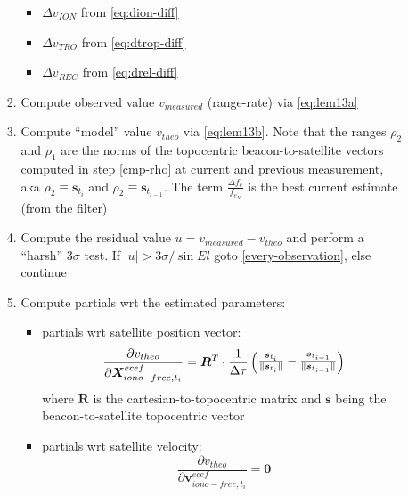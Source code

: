 \begin{enumerate}
\begin{enumerate}
\begin{enumerate}
              \begin{itemize}
                \item $\Delta v_{ION}$ from \ref{eq:dion-diff}
                \item $\Delta v_{TRO}$ from \ref{eq:dtrop-diff}
                \item $\Delta v_{REC}$ from \ref{eq:drel-diff}
              \end{itemize}
            \item Compute observed value $v_{measured}$ (range-rate) via \ref{eq:lem13a}
            \item Compute ``model'' value $v_{theo}$ via \ref{eq:lem13b}. Note that the ranges $\rho _2$ and 
              $\rho _1$ are the norms of the topocentric beacon-to-satellite vectors computed in 
              step \ref{cmp-rho} at current and previous measurement, aka $\rho _2 \equiv \bm{s}_{t_i}$ 
              and $\rho _2 \equiv \bm{s}_{t_{i-1}}$. The term $\frac{\Delta f_e}{f_{e_N}}$ is the 
              best current estimate (from the filter)
            \item Compute the residual value $u = v_{measured} - v_{theo}$ and 
              perform a ``harsh'' $3\sigma$ test. If $ |u| > 3 \sigma / \sin{El}$ 
              goto \ref{every-observation}, else continue
            \item Compute partials wrt the estimated parameters:
              \begin{itemize}
                \item partials wrt satellite position vector: 
                \begin{equation} 
                  \frac{\partial v_{theo}}{\partial \bm{X}^{ecef}_{iono-free,t_i}} = 
                    \bm{R}^T \cdot \frac{1}{\Delta \tau} \begin{pmatrix} 
                      \frac{\bm{s}_{t_i}}{\lVert\bm{s}_{t_i}\rVert} - \frac{\bm{s}_{t_{i-1}}}{\lVert\bm{s}_{t_{i-1}}\rVert}
                      \end{pmatrix}
                \end{equation}
                where $\bm{R}$ is the cartesian-to-topocentric matrix and $\bm{s}$ being the 
                beacon-to-satellite topocentric vector
                \item partials wrt satellite velocity: 
                \begin{equation} 
                  \frac{\partial v_{theo}}{\partial \bm{v}^{ecef}_{iono-free,t_i}} = \bm{0}
                \end{equation}

\end{itemize}
\end{enumerate}
\end{enumerate}
\end{enumerate}
